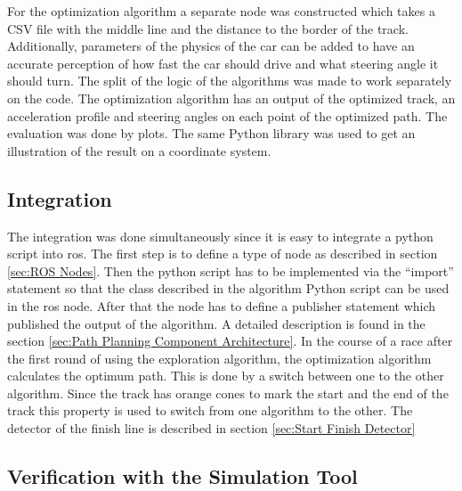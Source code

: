 For the optimization algorithm a separate node was constructed which takes a CSV file with the middle line and the distance to the border of the track. Additionally, parameters of the physics of the car can be added to have an accurate perception of how fast the car should drive and what steering angle it should turn. The split of the logic of the algorithms was made to work separately on the code. The optimization algorithm has an output of the optimized track, an acceleration profile and steering angles on each point of the optimized path. The evaluation was done by plots. The same Python library was used to get an illustration of the result on a coordinate system.

\subsection{Integration} \label{sec:Integration}
The integration was done simultaneously since it is easy to integrate a python script into \acrshort{ros}. The first step is to define a type of node as described in section \ref{sec:ROS Nodes}. Then the python script has to be implemented via the ``import'' statement so that the class described in the algorithm Python script can be used in the \acrshort{ros} node. After that the node has to define a publisher statement which published the output of the algorithm. A detailed description is found in the section \ref{sec:Path Planning Component Architecture}.
In the course of a race after the first round of using the exploration algorithm, the optimization algorithm calculates the optimum path. This is done by a switch between one to the other algorithm. Since the track has orange cones to mark the start and the end of the track this property is used to switch from one algorithm to the other. The detector of the finish line is described in section \ref{sec:Start Finish Detector}

\subsection{Verification with the Simulation Tool} \label{sec:Verification with the Simulation Tool}


